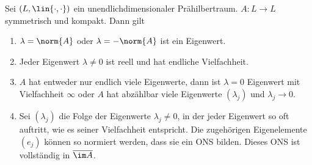 \begin{prop}[Hauptsatz]
\label{prop:1.30}
Sei $(L,\lin{\cdot,\cdot})$ ein unendlichdimensionaler Prähilbertraum. $A: L\to
L$ symmetrisch und kompakt. Dann gilt
\begin{enumerate}[label=(\roman{*})]
  \item $\lambda = \norm{A}$ oder $\lambda = -\norm{A}$ ist ein Eigenwert.
  \item Jeder Eigenwert $\lambda\neq 0$ ist reell und hat endliche Vielfachheit.
  \item $A$ hat entweder nur endlich viele Eigenwerte, dann ist $\lambda=0$
  Eigenwert mit Vielfachheit $\infty$ oder $A$ hat abzählbar viele Eigenwerte
  $(\lambda_j)$ und $\lambda_j \to 0$.
  \item Sei $(\lambda_j)$ die Folge der Eigenwerte $\lambda_j\neq 0$, in der
  jeder Eigenwert so oft auftritt, wie es seiner Vielfachheit entspricht. Die
  zugehörigen Eigenelemente $(e_j)$ können so normiert werden, dass sie ein 
  ONS bilden. Dieses ONS ist vollständig in $\overline{\im
  A}$.\fishhere
\end{enumerate}
\end{prop}
